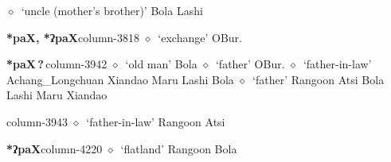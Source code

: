          $\diamond$~`uncle (mother's brother)'
         Bola 
\hspace{1ex}
         Lashi 
  \item {\footnotesize \textbf{*paX, *ʔpaX}}{\tiny column-3818}
         $\diamond$~`exchange'
         OBur. 
  \item {\footnotesize \textbf{*paX\,?\,}}{\tiny column-3942}
         $\diamond$~`old man'
         Bola 
\hspace{1ex}
         $\diamond$~`father'
         OBur. 
\hspace{1ex}
         $\diamond$~`father-in-law'
         Achang\_Longchuan 
\hspace{1ex}
         Xiandao 
\hspace{1ex}
         Maru 
\hspace{1ex}
         Lashi 
\hspace{1ex}
         Bola 
\hspace{1ex}
         $\diamond$~`father'
         Rangoon 
\hspace{1ex}
         Atsi 
\hspace{1ex}
         Bola 
\hspace{1ex}
         Lashi 
\hspace{1ex}
         Maru 
\hspace{1ex}
         Xiandao 
  \item {\footnotesize \textbf{}}{\tiny column-3943}
         $\diamond$~`father-in-law'
         Rangoon 
\hspace{1ex}
         Atsi 
  \item {\footnotesize \textbf{*ʔpaX}}{\tiny column-4220}
         $\diamond$~`flatland'
         Rangoon 
\hspace{1ex}
         Bola 

